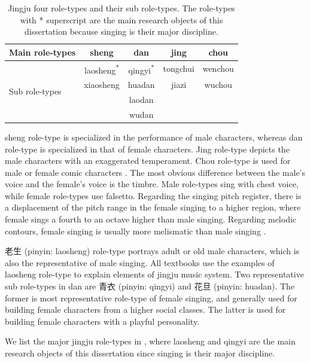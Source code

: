 \begin{table}[ht!]
\caption{Jingju four role-types and their sub role-types. The role-types with * superscript are the main research objects of this dissertation because singing is their major discipline.}
\label{tab:role-types}
\centering
\begin{tabular}{l|cccc}
\toprule
Main role-types & sheng               & dan                           & jing & chou \\
\midrule
\multirow{4}{*}{Sub role-types} & laosheng\textsuperscript{*} & qingyi\textsuperscript{*} & tongchui    & wenchou   \\
& xiaosheng & huadan & jiazi & wuchou \\
&&laodan&& \\
&&wudan&& \\
\bottomrule
\end{tabular}
\end{table}

\Gls{sheng} role-type is specialized in the performance of male characters, whereas \gls{dan} role-type is specialized in that of female characters. Jing role-type depicts the male characters with an exaggerated temperament. Chou role-type is used for male or female comic characters \cite{Repetto2018}. The most obvious difference between the male's voice and the female's voice is the timbre. Male role-types sing with chest voice, while female role-types use falsetto. Regarding the singing pitch register, there is a displacement of the pitch range in the female singing to a higher region, where female sings a fourth to an octave higher than male singing. Regarding melodic contours, female singing is usually more melismatic than male singing \cite{Wichmann1991a}. 

老生 (pinyin: \gls{laosheng}) role-type portrays adult or old male characters, which is also the representative of male singing. All textbooks use the examples of \gls{laosheng} role-type to explain elements of jingju music system. Two representative sub role-types in \gls{dan} are 青衣 (pinyin: qingyi) and 花旦 (pinyin: huadan). The former is most representative role-type of female singing, and generally used for building female characters from a higher social classes. The latter is used for building female characters with a playful personality.

We list the major jingju role-types in , where \gls{laosheng} and qingyi are the main research objects of this dissertation since singing is their major discipline.


